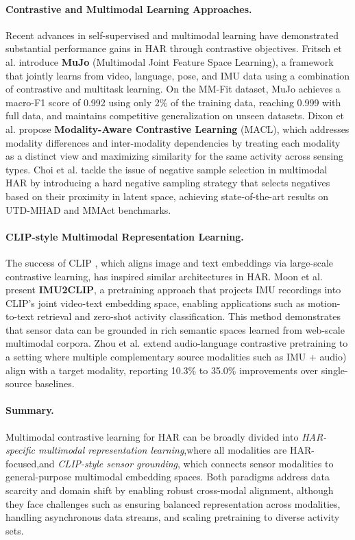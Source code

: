 \paragraph{Contrastive and Multimodal Learning Approaches.}
Recent advances in self-supervised and multimodal learning have demonstrated substantial performance gains in HAR through contrastive objectives. 
Fritsch et al. \cite{fritsch2025mujo} introduce \textbf{MuJo} (Multimodal Joint Feature Space Learning), a framework that jointly learns from video, language, pose, and IMU data using a combination of contrastive and multitask learning. On the MM-Fit dataset, MuJo achieves a macro-F1 score of 0.992 using only 2\% of the training data, reaching 0.999 with full data, and maintains competitive generalization on unseen datasets. 
Dixon et al. \cite{dixon2024modality} propose \textbf{Modality-Aware Contrastive Learning} (MACL), which addresses modality differences and inter-modality dependencies by treating each modality as a distinct view and maximizing similarity for the same activity across sensing types. 
Choi et al. \cite{choi2023multimodal} tackle the issue of negative sample selection in multimodal HAR by introducing a hard negative sampling strategy that selects negatives based on their proximity in latent space, achieving state-of-the-art results on UTD-MHAD and MMAct benchmarks.

\paragraph{CLIP-style Multimodal Representation Learning.}
The success of CLIP \cite{radford2021learning}, which aligns image and text embeddings via large-scale contrastive learning, has inspired similar architectures in HAR. 
Moon et al. \cite{moon2022imu2clip} present \textbf{IMU2CLIP}, a pretraining approach that projects IMU recordings into CLIP’s joint video-text embedding space, enabling applications such as motion-to-text retrieval and zero-shot activity classification. This method demonstrates that sensor data can be grounded in rich semantic spaces learned from web-scale multimodal corpora. 
Zhou et al. \cite{zhou2024cross} extend audio-language contrastive pretraining to a setting where multiple complementary source modalities such as IMU + audio) align with a target modality, reporting 10.3\% to 35.0\% improvements over single-source baselines.

\paragraph{Summary.}
Multimodal contrastive learning for HAR can be broadly divided into \emph{HAR-specific multimodal representation learning},where all modalities are HAR-focused,and \emph{CLIP-style sensor grounding}, which connects sensor modalities to general-purpose multimodal embedding spaces. Both paradigms address data scarcity and domain shift by enabling robust cross-modal alignment, although they face challenges such as ensuring balanced representation across modalities, handling asynchronous data streams, and scaling pretraining to diverse activity sets.




